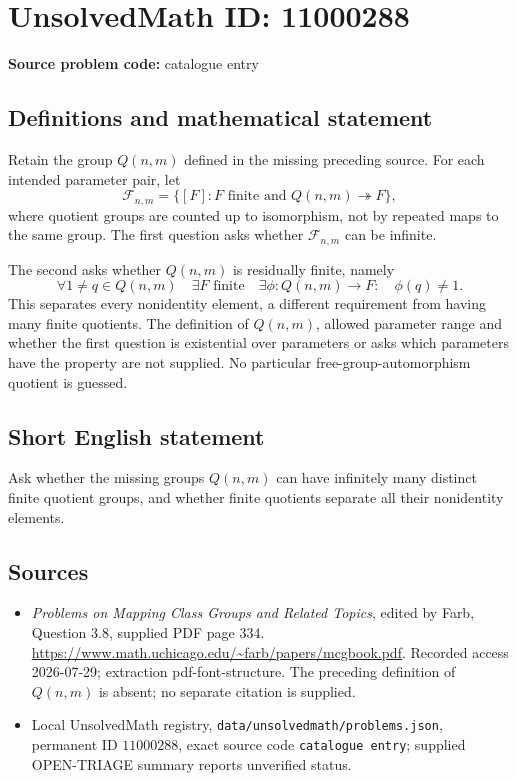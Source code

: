 \documentclass[11pt]{article}
\begin{document}
\section*{UnsolvedMath ID: 11000288}
\textbf{Source problem code:} catalogue entry
\subsection{Definitions and mathematical statement}
Retain the group \(Q(n,m)\) defined in the missing preceding source. For each intended parameter pair, let
\[
 \mathcal F_{n,m}=\{[F]:F\text{ finite and }Q(n,m)\twoheadrightarrow F\},
\]
where quotient groups are counted up to isomorphism, not by repeated maps to the same group. The first question asks whether \(\mathcal F_{n,m}\) can be infinite.

The second asks whether \(Q(n,m)\) is residually finite, namely
\[
 \forall1\ne q\in Q(n,m)\quad\exists F\text{ finite}\quad
 \exists\phi:Q(n,m)\to F:\quad\phi(q)\ne1.
\]
This separates every nonidentity element, a different requirement from having many finite quotients. The definition of \(Q(n,m)\), allowed parameter range and whether the first question is existential over parameters or asks which parameters have the property are not supplied. No particular free-group-automorphism quotient is guessed.
\subsection{Short English statement}
Ask whether the missing groups \(Q(n,m)\) can have infinitely many distinct finite quotient groups, and whether finite quotients separate all their nonidentity elements.
\subsection{Sources}
\begin{itemize}
\item \emph{Problems on Mapping Class Groups and Related Topics}, edited by Farb, Question 3.8, supplied PDF page 334. \url{https://www.math.uchicago.edu/~farb/papers/mcgbook.pdf}. Recorded access 2026-07-29; extraction pdf-font-structure. The preceding definition of \(Q(n,m)\) is absent; no separate citation is supplied.
\item Local UnsolvedMath registry, \texttt{data/unsolvedmath/problems.json}, permanent ID \(11000288\), exact source code \texttt{catalogue entry}; supplied OPEN-TRIAGE summary reports unverified status.
\end{itemize}
\end{document}
